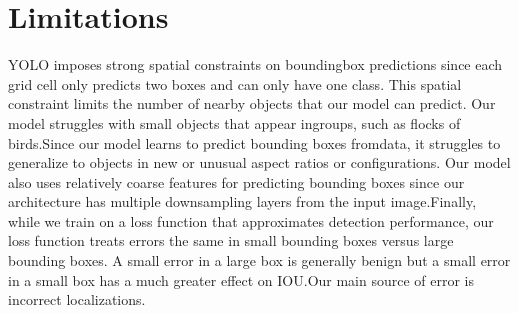 \chapter[Limitations]{Limitations}

\regularsection
\headerregularsection

\updatemylof %
\updatemylot %

\begin{sloppypar} %
YOLO imposes strong spatial constraints on boundingbox predictions since each grid cell only predicts two boxes and can only have one class. This spatial constraint limits the number of nearby objects that our model can predict. Our model struggles with small objects that appear ingroups, such as flocks of birds.Since our model learns to predict bounding boxes fromdata, it struggles to generalize to objects in new or unusual aspect ratios or configurations. Our model also uses relatively coarse features for predicting bounding boxes since our architecture has multiple downsampling layers from the input image.Finally, while we train on a loss function that approximates detection performance, our loss function treats errors the same in small bounding boxes versus large bounding boxes. A small error in a large box is generally benign but a small error in a small box has a much greater effect on IOU.Our main source of error is incorrect localizations.
\end{sloppypar}




{}
\specialsection %
\headerspecialsection

{\hypersetup{urlcolor=ntnu,linkcolor=sophia} %

  
}
